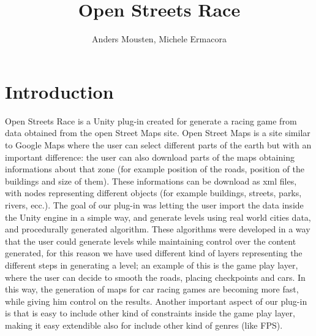 \documentclass[conference]{IEEEtran}
\begin{document}
\title{\ \\ \LARGE\bf Open Streets Race}

\author{Anders Mousten, Michele Ermacora}


\maketitle

%

\section{Introduction}

Open Streets Race is a Unity \cite{unity} plug-in created for generate a racing game from data obtained from the open Street Maps \cite{openstreet} site. Open Street Maps is a site similar to Google Maps \cite{gmaps} where the user can select different parts of the earth but with an important difference: the user can also download parts of the maps obtaining informations about that zone (for example position of the roads, position of the buildings and size of them). These informations can be download as xml files, with nodes representing different objects (for example buildings, streets, parks, rivers, ecc.). The goal of our plug-in was letting the user import the data inside the Unity \cite{unity} engine in a simple way, and generate levels using real world cities data, and procedurally generated algorithm. These algorithms were developed in a way that the user could generate levels while maintaining control over the content generated, for this reason we have used different kind of layers representing the different steps in generating a level; an example of this is the game play layer, where the user can decide to smooth the roads, placing checkpoints and cars. In this way, the generation of maps for car racing games are becoming more fast, while giving him control on the results. Another important aspect of our plug-in is that is easy to include other kind of constraints inside the game play layer, making it easy extendible also for include other kind of genres (like FPS).
\end{document}
